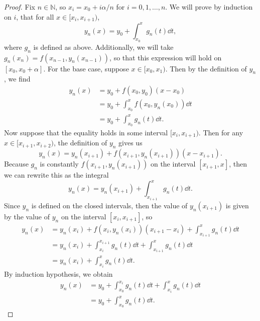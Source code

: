 \documentclass[12pt]{article}
\theoremstyle{definition}
\newcommand{\N}{\mathbb{N}}
\begin{document}
\begin{proof}
    Fix $n \in \N$, so $x_i = x_0 + i\alpha/n$ for $i = 0, 1, \dots, n$. We will prove by induction on $i$, that for all $x \in [x_i, x_{i+1})$,
    \[
        y_n(x) = y_0 + \int_{x_0}^{x} g_n(t) \dd{t},
    \]
    where $g_n$ is defined as above. Additionally, we will take $g_n(x_n) = f(x_{n-1}, y_n(x_{n-1}))$, so that this expression will hold on $[x_0, x_0 + \alpha]$. For the base case, suppose $x \in [x_0, x_1)$. Then by the definition of $y_n$, we find
    \begin{align*}
        y_n(x)
            &= y_0 + f(x_0, y_0)(x - x_0) \\
            &= y_0 + \int_{x_0}^{x} f(x_0, y_n(x_0)) \dd{t} \\
            &= y_0 + \int_{x_0}^{x} g_n(t) \dd{t}.
    \end{align*}
    Now suppose that the equality holds in some interval $[x_i, x_{i+1})$. Then for any $x \in [x_{i+1}, x_{i+2})$, the definition of $y_n$ gives us
    \[
        y_n(x) = y_n(x_{i+1}) + f(x_{i+1}, y_n(x_{i+1}))(x - x_{i+1}).
    \]
    Because $g_n$ is constantly $f(x_{i+1}, y_n(x_{i+1}))$ on the interval $[x_{i+1}, x]$, then we can rewrite this as the integral
    \[
         y_n(x) = y_n(x_{i+1}) + \int_{x_{i+1}}^{x} g_n(t) \dd{t}.
    \]
    Since $y_n$ is defined on the closed intervals, then the value of $y_n(x_{i+1})$ is given by the value of $y_n$ on the interval $[x_i, x_{i+1}]$, so
    \begin{align*}
        y_n(x)
            &= y_n(x_i) + f(x_i, y_n(x_i))(x_{i+1} - x_i) + \int_{x_{i+1}}^{x} g_n(t) \dd{t} \\
            &= y_n(x_i) + \int_{x_i}^{x_{i+1}} g_n(t) \dd{t} + \int_{x_{i+1}}^{x} g_n(t) \dd{t} \\
            &= y_n(x_i) + \int_{x_i}^{x} g_n(t) \dd{t}.
    \end{align*}
    By induction hypothesis, we obtain
    \begin{align*}
        y_n(x)
            &= y_0 + \int_{x_0}^{x_i} g_n(t) \dd{t} + \int_{x_i}^{x} g_n(t) \dd{t} \\
            &= y_0 + \int_{x_0}^{x} g_n(t) \dd{t}.
    \end{align*}
    

\end{proof}
\end{document}
